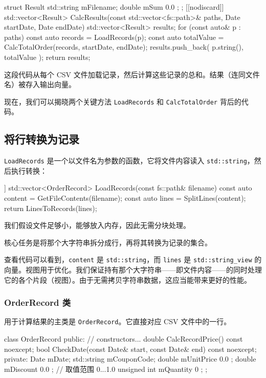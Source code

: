 \begin{codebox}[cpp]
struct Result
{
std::string mFilename;
double mSum{ 0.0 };
};
[[nodiscard]] std::vector<Result>
CalcResults(const std::vector<fs::path>& paths, Date startDate, Date endDate)
{
std::vector<Result> results;
for (const auto& p : paths)
{
const auto records = LoadRecords(p);
const auto totalValue = CalcTotalOrder(records, startDate, endDate);
results.push_back({ p.string(), totalValue });
}
return results;
}
\end{codebox}

这段代码从每个 CSV 文件加载记录，然后计算这些记录的总和。结果（连同文件名）被存入输出向量。

现在，我们可以揭晓两个关键方法 \texttt{LoadRecords} 和 \texttt{CalcTotalOrder} 背后的代码。

\subsection{将行转换为记录}

\texttt{LoadRecords} 是一个以文件名为参数的函数，它将文件内容读入 \texttt{std::string}，然后执行转换：

\begin{codebox}[cpp]
[[nodiscard]] std::vector<OrderRecord> LoadRecords(const fs::path& filename)
{
const auto content = GetFileContents(filename);
const auto lines = SplitLines(content);
return LinesToRecords(lines);
}
\end{codebox}

我们假设文件足够小，能够放入内存，因此无需分块处理。

核心任务是将那个大字符串拆分成行，再将其转换为记录的集合。

查看代码可以看到，\texttt{content} 是 \texttt{std::string}，而 \texttt{lines} 是 \texttt{std::string\_view} 的向量。视图用于优化。我们保证持有那个大字符串——即文件内容——的同时处理它的各个片段（视图）。由于无需拷贝字符串数据，这应当能带来更好的性能。

\subsubsection*{OrderRecord 类}

用于计算结果的主类是 \texttt{OrderRecord}。它直接对应 CSV 文件中的一行。

\begin{codebox}[cpp]
class OrderRecord
{
public:
// constructors...
double CalcRecordPrice() const noexcept;
bool CheckDate(const Date& start, const Date& end) const noexcept;
private:
Date mDate;
std::string mCouponCode;
double mUnitPrice{ 0.0 };
double mDiscount{ 0.0 }; // 取值范围 0...1.0
unsigned int mQuantity{ 0 };
};
\end{codebox}

